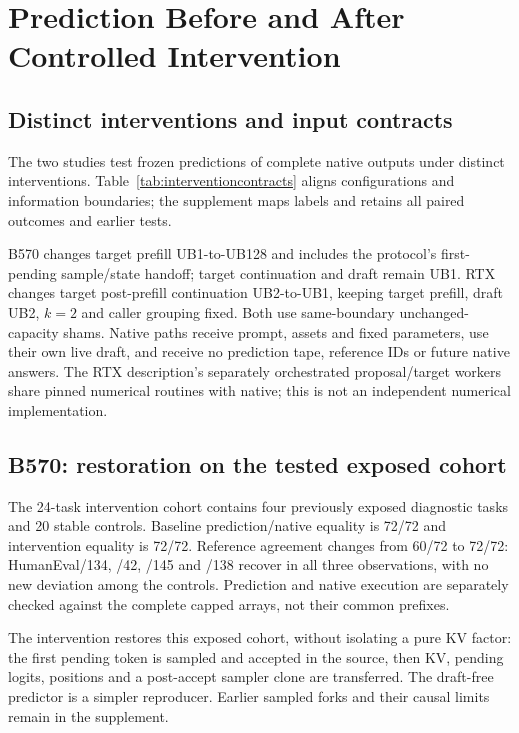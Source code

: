 \section{Prediction Before and After Controlled Intervention}
\label{sec:results}\label{sec:diagnoses}\label{sec:b570mechanism}\label{sec:rtxreplay}
\subsection{Distinct interventions and input contracts}
The two studies test frozen predictions of complete native outputs under distinct interventions. Table~\ref{tab:interventioncontracts} aligns configurations and information boundaries; the supplement maps labels and retains all paired outcomes and earlier tests.


B570 changes target prefill UB1-to-UB128 and includes the protocol's first-pending sample/state handoff; target continuation and draft remain UB1. RTX changes target post-prefill continuation UB2-to-UB1, keeping target prefill, draft UB2, $k=2$ and caller grouping fixed. Both use same-boundary unchanged-capacity shams. Native paths receive prompt, assets and fixed parameters, use their own live draft, and receive no prediction tape, reference IDs or future native answers. The RTX description's separately orchestrated proposal/target workers share pinned numerical routines with native; this is not an independent numerical implementation.

\subsection{B570: restoration on the tested exposed cohort}
The 24-task intervention cohort contains four previously exposed diagnostic tasks and 20 stable controls. Baseline prediction/native equality is 72/72 and intervention equality is 72/72. Reference agreement changes from 60/72 to 72/72: HumanEval/134, /42, /145 and /138 recover in all three observations, with no new deviation among the controls. Prediction and native execution are separately checked against the complete capped arrays, not their common prefixes.

The intervention restores this exposed cohort, without isolating a pure KV factor: the first pending token is sampled and accepted in the source, then KV, pending logits, positions and a post-accept sampler clone are transferred. The draft-free predictor is a simpler reproducer. Earlier sampled forks and their causal limits remain in the supplement.

